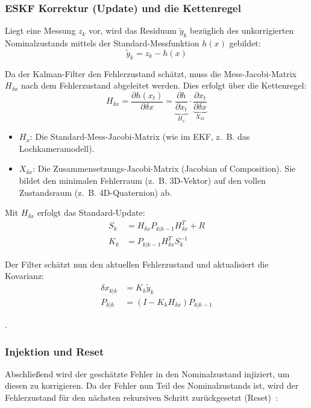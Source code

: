 \subsubsection{ESKF Korrektur (Update) und die Kettenregel}
Liegt eine Messung $z_k$ vor, wird das Residuum $\tilde{y}_k$ bezüglich des unkorrigierten Nominalzustands mittels der Standard-Messfunktion $h(x)$ gebildet:
\begin{equation}
    \tilde{y}_k = z_k - h(x)
\end{equation}

Da der Kalman-Filter den Fehlerzustand schätzt, muss die Mess-Jacobi-Matrix $H_{\delta x}$ nach dem Fehlerzustand abgeleitet werden. Dies erfolgt über die Kettenregel:
\begin{equation}
    H_{\delta x} = \frac{\partial h(x_t)}{\partial \delta x} = \underbrace{\frac{\partial h}{\partial x_t}}_{H_x} \cdot \underbrace{\frac{\partial x_t}{\partial \delta x}}_{X_{\delta x}}
\end{equation}
\begin{itemize}
    \item $H_x$: Die Standard-Mess-Jacobi-Matrix (wie im \ac{EKF}, z.~B. das Lochkameramodell).
    \item $X_{\delta x}$: Die Zusammensetzungs-Jacobi-Matrix (Jacobian of Composition). Sie bildet den minimalen Fehlerraum (z.~B. 3D-Vektor) auf den vollen Zustandsraum (z.~B. 4D-Quaternion) ab.
\end{itemize}

Mit $H_{\delta x}$ erfolgt das Standard-Update:
\begin{align}
    S_k &= H_{\delta x} P_{k|k-1} H_{\delta x}^T + R \\
    K_k &= P_{k|k-1} H_{\delta x}^T S_k^{-1}
\end{align}

Der Filter schätzt nun den aktuellen Fehlerzustand und aktualisiert die Kovarianz:
\begin{align}
    \delta x_{k|k} &= K_k \tilde{y}_k \\
    P_{k|k} &= (I - K_k H_{\delta x}) P_{k|k-1}
\end{align}

\cite{forster2017manifold}.

\subsubsection{Injektion und Reset}
Abschließend wird der geschätzte Fehler in den Nominalzustand injiziert, um diesen zu korrigieren. Da der Fehler nun Teil des Nominalzustands ist, wird der Fehlerzustand für den nächsten rekursiven Schritt zurückgesetzt (Reset)~\cite{forster2017manifold}:

